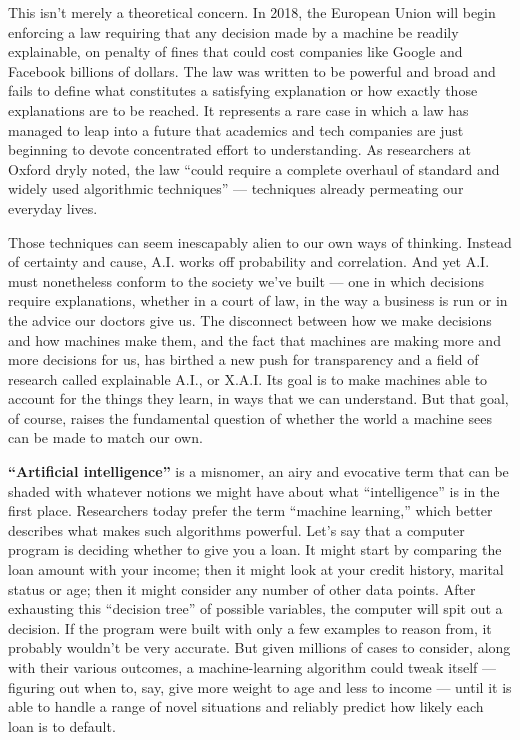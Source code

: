 This isn't merely a theoretical concern. In 2018, the European Union
will begin enforcing a law requiring that any decision made by a machine
be readily explainable, on penalty of fines that could cost companies
like Google and Facebook billions of dollars. The law was written to be
powerful and broad and fails to define what constitutes a satisfying
explanation or how exactly those explanations are to be reached. It
represents a rare case in which a law has managed to leap into a future
that academics and tech companies are just beginning to devote
concentrated effort to understanding. As researchers at Oxford dryly
noted, the law ``could require a complete overhaul of standard and
widely used algorithmic techniques'' --- techniques already permeating
our everyday lives.

Those techniques can seem inescapably alien to our own ways of thinking.
Instead of certainty and cause, A.I. works off probability and
correlation. And yet A.I. must nonetheless conform to the society we've
built --- one in which decisions require explanations, whether in a
court of law, in the way a business is run or in the advice our doctors
give us. The disconnect between how we make decisions and how machines
make them, and the fact that machines are making more and more decisions
for us, has birthed a new push for transparency and a field of research
called explainable A.I., or X.A.I. Its goal is to make machines able to
account for the things they learn, in ways that we can understand. But
that goal, of course, raises the fundamental question of whether the
world a machine sees can be made to match our own.

\textbf{``Artificial intelligence''} is a misnomer, an airy and
evocative term that can be shaded with whatever notions we might have
about what ``intelligence'' is in the first place. Researchers today
prefer the term ``machine learning,'' which better describes what makes
such algorithms powerful. Let's say that a computer program is deciding
whether to give you a loan. It might start by comparing the loan amount
with your income; then it might look at your credit history, marital
status or age; then it might consider any number of other data points.
After exhausting this ``decision tree'' of possible variables, the
computer will spit out a decision. If the program were built with only a
few examples to reason from, it probably wouldn't be very accurate. But
given millions of cases to consider, along with their various outcomes,
a machine-learning algorithm could tweak itself --- figuring out when
to, say, give more weight to age and less to income --- until it is able
to handle a range of novel situations and reliably predict how likely
each loan is to default.

